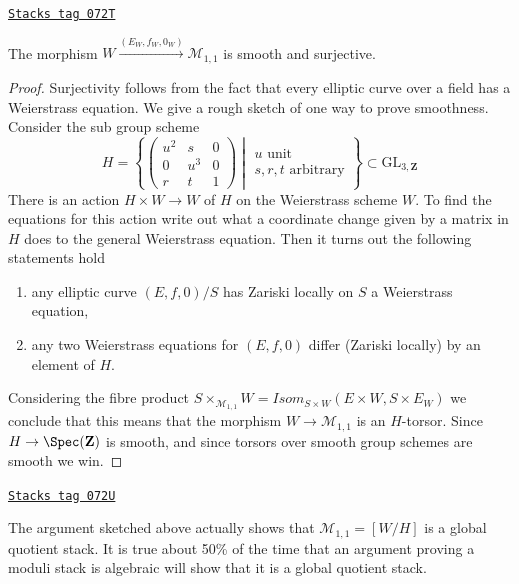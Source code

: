 \begin{lemma}
\label{stacks-introduction-lemma-Weierstrass-smooth-cover}
\href{https://stacks.math.columbia.edu/tag/072T}{\texttt{Stacks tag 072T}}

The morphism $W \xrightarrow{(E_W, f_W, 0_W)} \mathcal{M}_{1, 1}$ is smooth
and surjective.
\end{lemma}

\begin{proof}
Surjectivity follows from the fact that every elliptic curve over a
field has a Weierstrass equation. We give a rough sketch of one
way to prove smoothness. Consider the sub group scheme
$$
H =
\left\{
\left(
\begin{matrix}
u^2 & s & 0 \\
0 & u^3 & 0 \\
r & t & 1
\end{matrix}
\right)
\middle|
\begin{matrix}
u\text{ unit} \\
s, r, t\text{ arbitrary}
\end{matrix}
\right\}
\subset
\text{GL}_{3, \mathbf{Z}}
$$
There is an action $H \times W \to W$ of $H$ on the Weierstrass scheme $W$.
To find the equations for this action write out what a coordinate change
given by a matrix in $H$ does to the general Weierstrass equation.
Then it turns out the following statements hold
\begin{enumerate}
\item any elliptic curve $(E, f, 0)/S$ has Zariski locally on $S$
a Weierstrass equation,
\item any two Weierstrass equations for $(E, f, 0)$ differ (Zariski locally)
by an element of $H$.
\end{enumerate}
Considering the fibre product
$S \times_{\mathcal{M}_{1, 1}} W =
\mathit{Isom}_{S \times W}(E \times W, S \times E_W)$
we conclude that this means that the morphism
$W \to \mathcal{M}_{1, 1}$ is an $H$-torsor.
Since $H \to \Spec(\mathbf{Z})$ is smooth, and since torsors
over smooth group schemes are smooth we win.
\end{proof}

\begin{remark}
\label{stacks-introduction-remark-quotient-stack}
\href{https://stacks.math.columbia.edu/tag/072U}{\texttt{Stacks tag 072U}}

The argument sketched above actually shows that
$\mathcal{M}_{1, 1} = [W/H]$ is a global quotient stack.
It is true about 50\% of the time that an argument proving a moduli
stack is algebraic will show that it is a global quotient stack.
\end{remark}

